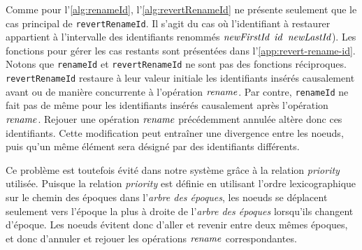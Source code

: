 
Comme pour l'\autoref{alg:renameId}, l'\autoref{alg:revertRenameId} ne présente seulement que le cas principal de \texttt{revertRenameId}.
Il s'agit du cas où l'identifiant à restaurer appartient à l'intervalle des identifiants renommés $\mathit{newFirstId}$ \leqid $\mathit{id}$ \leqid $\mathit{newLastId}$).
Les fonctions pour gérer les cas restants sont présentées dans l'\autoref{app:revert-rename-id}.\\

Notons que \texttt{renameId} et \texttt{revertRenameId} ne sont pas des fonctions réciproques.
\texttt{revertRenameId} restaure à leur valeur initiale les identifiants insérés causalement avant ou de manière concurrente à l'opération $\mathit{rename}$.
Par contre, \texttt{renameId} ne fait pas de même pour les identifiants insérés causalement après l'opération $\mathit{rename}$.
Rejouer une opération $\mathit{rename}$ précédemment annulée altère donc ces identifiants.
Cette modification peut entraîner une divergence entre les noeuds, puis qu'un même élément sera désigné par des identifiants différents.

Ce problème est toutefois évité dans notre système grâce à la relation \emph{priority} utilisée.
Puisque la relation \emph{priority} est définie en utilisant l'ordre lexicographique sur le chemin des époques dans l'\emph{arbre des époques}, les noeuds se déplacent seulement vers l'époque la plus à droite de l'\emph{arbre des époques} lorsqu'ils changent d'époque.
Les noeuds évitent donc d'aller et revenir entre deux mêmes époques, et donc d'annuler et rejouer les opérations $\mathit{rename}$ correspondantes.
